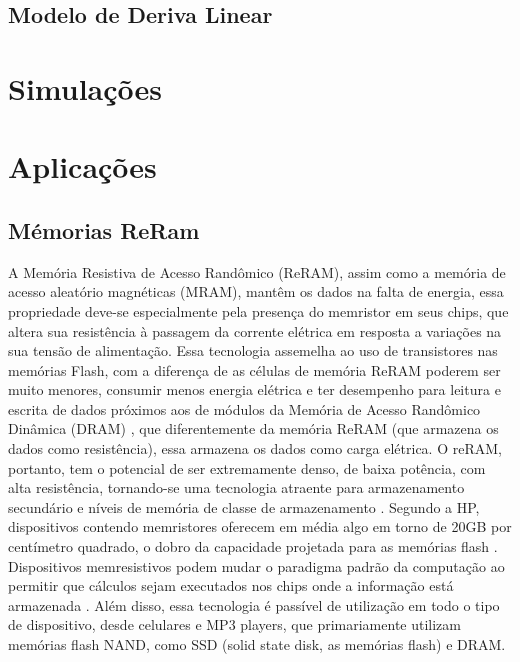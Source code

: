 \documentclass{ceel}
\begin{document}
\begin{multicols}{2}
\begin{figure}[H]
\caption{}\label{}
\end{figure}



\subsection{Modelo de Deriva Linear}

\section{Simulações} \label{sim}


\section{Aplicações}\label{aplicacoes}
\subsection{Mémorias ReRam}
A Memória Resistiva de Acesso Randômico (ReRAM), assim como a memória de acesso aleatório magnéticas (MRAM), mantêm os dados na falta de energia, essa propriedade deve-se especialmente pela presença do memristor em seus chips, que altera sua resistência à passagem da corrente elétrica em resposta a variações na sua tensão de alimentação.
Essa tecnologia assemelha ao uso de transistores nas memórias Flash, com a diferença de as células de memória ReRAM poderem ser muito menores, consumir menos energia elétrica e ter desempenho para leitura e escrita de dados próximos aos de módulos da Memória de Acesso Randômico Dinâmica (DRAM)\cite{blog} , que diferentemente da memória ReRAM (que armazena os dados como resistência), essa armazena os dados como carga elétrica.
O reRAM, portanto, tem o potencial de ser extremamente denso, de baixa potência, com alta resistência, tornando-se uma tecnologia atraente para armazenamento secundário e níveis de memória de classe de armazenamento \cite{prog}. Segundo a HP, dispositivos contendo memristores oferecem em média algo em torno de 20GB por centímetro quadrado, o dobro da capacidade projetada para as memórias flash \cite{hp}.
Dispositivos memresistivos podem mudar o paradigma padrão da computação ao permitir que cálculos sejam executados nos chips onde a informação está armazenada \cite{hp}. Além disso, essa tecnologia é passível de utilização em todo o tipo de dispositivo, desde celulares e MP3 players, que primariamente utilizam memórias flash NAND, como SSD (solid state disk, as memórias flash) e DRAM.


\end{multicols}
\end{document}
